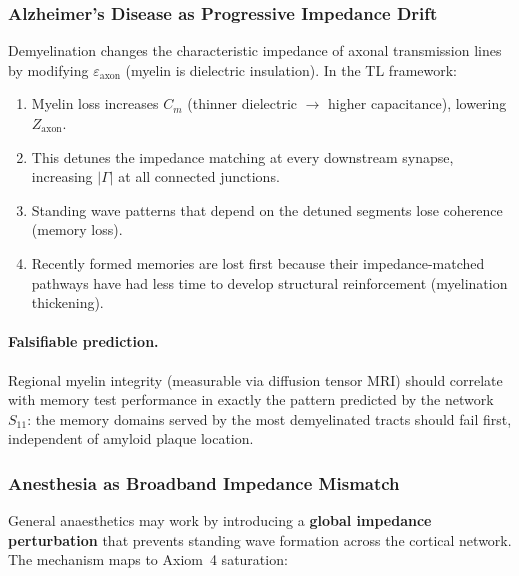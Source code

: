 \subsubsection{Alzheimer's Disease as Progressive Impedance Drift}
\label{sec:alzheimers}

Demyelination changes the characteristic impedance of axonal
transmission lines by modifying $\varepsilon_\text{axon}$
(myelin is dielectric insulation).  In the TL framework:

\begin{enumerate}
    \item Myelin loss increases $C_m$ (thinner dielectric
          $\to$ higher capacitance), lowering $Z_\text{axon}$.
    \item This detunes the impedance matching at every
          downstream synapse, increasing $|\Gamma|$ at all
          connected junctions.
    \item Standing wave patterns that depend on the detuned
          segments lose coherence (memory loss).
    \item Recently formed memories are lost first because
          their impedance-matched pathways have had less
          time to develop structural reinforcement
          (myelination thickening).
\end{enumerate}

\paragraph{Falsifiable prediction.}
Regional myelin integrity (measurable via diffusion tensor
MRI) should correlate with memory test performance in
exactly the pattern predicted by the network $S_{11}$: the
memory domains served by the most demyelinated tracts should
fail first, independent of amyloid plaque location.

\subsubsection{Anesthesia as Broadband Impedance Mismatch}
\label{sec:anesthesia}

General anaesthetics may work by introducing a \textbf{global
impedance perturbation} that prevents standing wave formation
across the cortical network.  The mechanism maps to Axiom~4
saturation:

